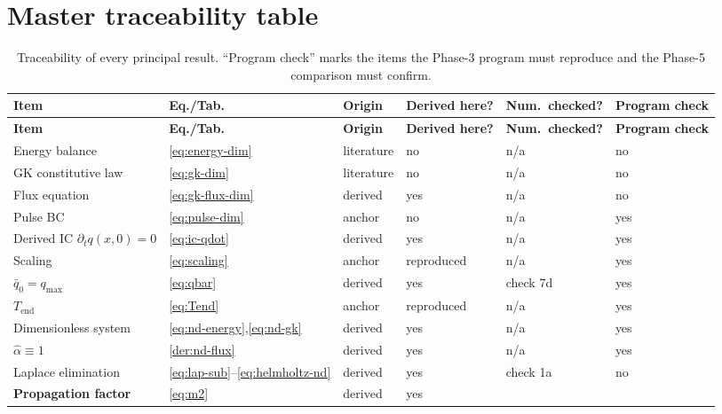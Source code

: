 \documentclass[11pt,a4paper]{article}
\theoremstyle{definition}
\begin{document}
\section{Master traceability table}
\label{sec:traceability}

\begin{longtable}{@{}p{3.5cm}p{1.6cm}p{2.6cm}p{1.5cm}p{1.5cm}p{1.6cm}@{}}
\caption{Traceability of every principal result. ``Program check'' marks the
         items the Phase-3 program must reproduce and the Phase-5 comparison
         must confirm.}
\label{tab:traceability}\\
\toprule
\textbf{Item} & \textbf{Eq./Tab.} & \textbf{Origin} &
\textbf{Derived here?} & \textbf{Num.\ checked?} & \textbf{Program check} \\
\midrule
\endfirsthead
\toprule
\textbf{Item} & \textbf{Eq./Tab.} & \textbf{Origin} &
\textbf{Derived here?} & \textbf{Num.\ checked?} & \textbf{Program check} \\
\midrule
\endhead
Energy balance & \eqref{eq:energy-dim} & literature
  \cite{Kovacs2018} & no & n/a & no \\
GK constitutive law & \eqref{eq:gk-dim} & literature
  \cite{GuyerKrumhansl1966a,GuyerKrumhansl1966b,Van2001} & no & n/a & no \\
Flux equation & \eqref{eq:gk-flux-dim} & derived & yes & n/a & no \\
Pulse BC & \eqref{eq:pulse-dim} & anchor \cite{Kovacs2018} & no & n/a & yes \\
Derived IC $\partial_t q(x,0)=0$ & \eqref{eq:ic-qdot} & derived & yes &
  n/a & yes \\
Scaling & \eqref{eq:scaling} & anchor \cite{Kovacs2018} & reproduced &
  n/a & yes \\
$\bar q_{0}=q_{\max}$ & \eqref{eq:qbar} & derived & yes & check 7d & yes \\
$T_{\mathrm{end}}$ & \eqref{eq:Tend} & anchor \cite{Kovacs2018} &
  reproduced & n/a & yes \\
Dimensionless system & \eqref{eq:nd-energy},\eqref{eq:nd-gk} & derived &
  yes & n/a & yes \\
$\hat\alpha\equiv1$ & \cref{der:nd-flux} & derived & yes & n/a & yes \\
Laplace elimination & \eqref{eq:lap-sub}--\eqref{eq:helmholtz-nd} & derived &
  yes & check 1a & no \\
\textbf{Propagation factor} & \eqref{eq:m2} & derived & yes &

\end{longtable}
\end{document}
